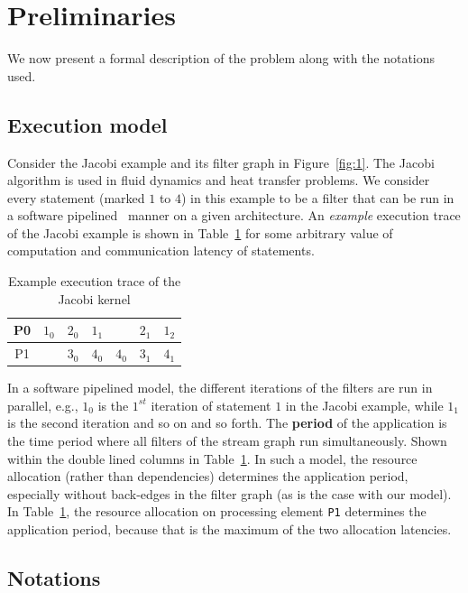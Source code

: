 \documentclass[10pt, conference, compsocconf]{IEEEtran}
\begin{document}
\section{Preliminaries}
\label{sec:preliminaries}

We now present a formal description of the problem along with the
notations used.

\subsection{Execution model}
\label{sec:execution-model}

Consider the Jacobi example and its filter graph in
Figure~\ref{fig:1}. The Jacobi algorithm is used in fluid dynamics and
heat transfer problems. We consider every statement (marked $1$ to $4$)
in this example to be a filter that can be run in a software
pipelined~\cite{audu09} manner on a given architecture. An
\textit{example} execution trace of the Jacobi example is shown in
Table~\ref{tab:3} for some arbitrary value of computation and
communication latency of statements.

\begin{table}[h!]
  \centering
  \begin{tabular}{|c|c|c||c|c|c||c|}
    \hline
    P0 & $1_0$ & $2_0$ & $1_1$ & & $2_1$ & $1_2$\\
    \hline
    P1 & & $3_0$ & $4_0$ & $4_0$ & $3_1$ & $4_1$\\
    \hline
  \end{tabular}
  \caption{Example execution trace of the Jacobi kernel}
  \label{tab:3}
\end{table}

In a software pipelined model, the different iterations of the filters
are run in parallel, e.g., $1_0$ is the $1^{st}$ iteration of statement
$1$ in the Jacobi example, while $1_1$ is the second iteration and so on
and so forth. The \textbf{period} of the application is the time period
where all filters of the stream graph run simultaneously. Shown within
the double lined columns in Table~\ref{tab:3}. In such a model, the
resource allocation (rather than dependencies) determines the
application period, especially without back-edges in the filter graph
(as is the case with our model). In Table~\ref{tab:3}, the resource
allocation on processing element \texttt{P1} determines the application
period, because that is the maximum of the two allocation latencies.

\subsection{Notations}
\end{document}
